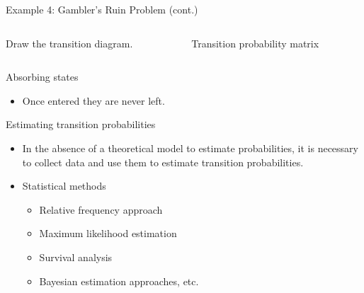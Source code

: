 \documentclass[12pt,ignorenonframetext,]{beamer}
\providecommand{\tightlist}{%
  \setlength{\itemsep}{0pt}\setlength{\parskip}{0pt}}
\begin{document}
\begin{frame}{Example 4: Gambler's Ruin Problem (cont.)}
\protect\hypertarget{example-4-gamblers-ruin-problem-cont.}{}
\begin{columns}
\begin{column}{0.5\textwidth}
 Draw the transition diagram.
\end{column}
\begin{column}{0.5\textwidth}
 Transition probability matrix
\end{column}
\end{columns}
\end{frame}

\begin{frame}{Absorbing states}
\protect\hypertarget{absorbing-states}{}
\begin{itemize}
\tightlist
\item
  Once entered they are never left.
\end{itemize}
\end{frame}

\begin{frame}{Estimating transition probabilities}
\protect\hypertarget{estimating-transition-probabilities}{}
\begin{itemize}
\item
  In the absence of a theoretical model to estimate probabilities, it is
  necessary to collect data and use them to estimate transition
  probabilities.
\item
  Statistical methods

  \begin{itemize}
  \item
    Relative frequency approach
  \item
    Maximum likelihood estimation
  \item
    Survival analysis
  \item
    Bayesian estimation approaches, etc.
  \end{itemize}
\end{itemize}
\end{frame}
\end{document}
